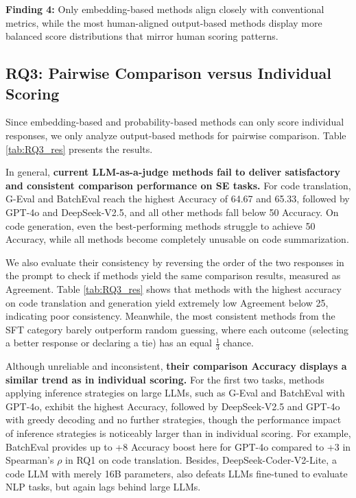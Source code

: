 \vspace*{6pt}
\begin{leftbar}
\textbf{Finding 4:} Only embedding-based methods align closely with conventional metrics, while the most human-aligned output-based methods display more balanced score distributions that mirror human scoring patterns.
\end{leftbar}
\vspace*{6pt}

\subsection{RQ3: Pairwise Comparison versus Individual Scoring}
Since embedding-based and probability-based methods can only score individual responses, we only analyze output-based methods for pairwise comparison. Table \ref{tab:RQ3_res} presents the results.

In general, \textbf{current LLM-as-a-judge methods fail to deliver satisfactory and consistent comparison performance on SE tasks.} For code translation, G-Eval and BatchEval reach the highest Accuracy of 64.67 and 65.33, followed by GPT-4o and DeepSeek-V2.5, and all other methods fall below 50 Accuracy. On code generation, even the best-performing methods struggle to achieve 50 Accuracy, while all methods become completely unusable on code summarization. 

We also evaluate their consistency by reversing the order of the two responses in the prompt to check if methods yield the same comparison results, measured as Agreement. Table \ref{tab:RQ3_res} shows that methods with the highest accuracy on code translation and generation yield extremely low Agreement below 25, indicating poor consistency. Meanwhile, the most consistent methods from the SFT category barely outperform random guessing, where each outcome (selecting a better response or declaring a tie) has an equal \(\frac 13\) chance.

Although unreliable and inconsistent, \textbf{their comparison Accuracy displays a similar trend as in individual scoring.} For the first two tasks, methods applying inference strategies on large LLMs, such as G-Eval and BatchEval with GPT-4o, exhibit the highest Accuracy, followed by DeepSeek-V2.5 and GPT-4o with greedy decoding and no further strategies, though the performance impact of inference strategies is noticeably larger than in individual scoring. For example, BatchEval provides up to +8 Accuracy boost here for GPT-4o compared to +3 in Spearman's \(\rho\) in RQ1 on code translation. Besides, DeepSeek-Coder-V2-Lite, a code LLM with merely 16B parameters, also defeats LLMs fine-tuned to evaluate NLP tasks, but again lags behind large LLMs.

